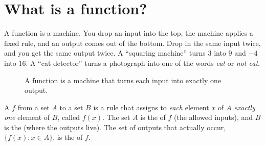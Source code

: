 \section{What is a function?}\label{sec:what-is-function}

\begin{picturethis}
A function is a machine. You drop an input into the top, the machine applies a
fixed rule, and an output comes out of the bottom. Drop in the same input
twice, and you get the same output twice. A ``squaring machine'' turns $3$
into $9$ and $-4$ into $16$. A ``cat detector'' turns a photograph into one
of the words \emph{cat} or \emph{not cat}.
\end{picturethis}

\begin{figure}[htbp]
\centering
{}
\caption{A function is a machine that turns each input into exactly one
  output.}
\label{fig:function-machine}
\end{figure}

\begin{definition}[Function]\label{def:function}
A  $f$ from a set $A$ to a set $B$ is a rule that assigns to
\emph{each} element $x$ of $A$ \emph{exactly one} element of $B$, called
$f(x)$. The set $A$ is the  of $f$ (the allowed inputs), and $B$
is the  (where the outputs live). The set of outputs that
actually occur, $\{f(x) : x \in A\}$, is the  of $f$.
\end{definition}


